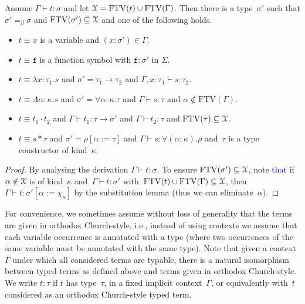 \documentclass[a4paper,UKenglish,cleveref,autoref,numberwithinsect]{lipics-v2019}
\theoremstyle{definition}
\newcommand{\arrtype}{\rightarrow}
\newcommand{\quant}[2]{\forall #1.#2}
\newcommand{\app}[2]{#1 \cdot #2}
\newcommand{\tapp}[2]{#1 * #2}
\newcommand{\subst}[2]{#1:=#2}
\newcommand{\abs}[2]{\lambda #1.#2}
\newcommand{\tabs}[2]{\Lambda #1.#2}
\newcommand{\FTV}{\mathrm{FTV}}
\newcommand{\Xc}{\CKchange{\mathcal{X}}}
\newcommand{\proves}{\vdash}
\newcommand{\CKchange}[1]{\textcolor{blue}{#1}}
\begin{document}
\begin{lemma}\label{lem:generation}
  Assume $\Gamma \proves t : \sigma$ and let $\Xc = \FTV(t) \cup
  \FTV(\Gamma)$. Then there is a type~$\sigma'$ such that $\sigma'
  =_\beta \sigma$ and $\FTV(\sigma') \subseteq \Xc$ and one of the
  following holds.
  \begin{itemize}
  \item $t \equiv x$ is a variable and $(x : \sigma') \in \Gamma$.
  \item $t \equiv \mathtt{f}$ is a function symbol with $\mathtt{f} :
    \sigma'$ in $\Sigma$.
  \item $t \equiv \abs{x:\tau_1}{s}$ and
    $\sigma'=\tau_1\arrtype\tau_2$ and $\Gamma, x : \tau_1 \vdash s :
    \tau_2$.
  \item $t \equiv \tabs{\alpha:\kappa}{s}$ and $\sigma' =
    \quant{\alpha:\kappa}{\tau}$ and $\Gamma \vdash s : \tau$ and $\alpha
    \notin \FTV(\Gamma)$.
  \item $t \equiv \app{t_1}{t_2}$ and
    $\Gamma \vdash t_1 : \tau \arrtype \sigma'$ and
    $\Gamma \vdash t_2 : \tau$ and $\FTV(\tau) \subseteq \Xc$.
  \item $t \equiv \tapp{s}{\tau}$ and
    $\sigma' = \rho[\subst{\alpha}{\tau}]$ and
    $\Gamma \vdash s : \quant{(\alpha:\kappa)}{\rho}$ and~$\tau$ is a
    type constructor of kind~$\kappa$.
  \end{itemize}
\end{lemma}

\begin{proof}
  By analysing the derivation $\Gamma \proves t : \sigma$. To
  ensure $\FTV(\sigma') \subseteq \Xc$, note \CKchange{that} if
  $\alpha \notin \Xc$
  is of kind~$\kappa$ and~$\Gamma \proves t : \sigma'$
  with~$\FTV(t) \cup \FTV(\Gamma) \subseteq \Xc$, then $\Gamma
  \proves t : \sigma'[\subst{\alpha}{\chi_\kappa}]$ by the
  substitution lemma (thus we can eliminate~$\alpha$).
\end{proof}

For convenience, we sometimes assume without loss of generality that
the terms are given in orthodox Church-style, i.e., instead of using
contexts we assume that each variable occurrence is annotated with a
type (where two occurrences of the same variable must be annotated
with the same type). Note that given a context~$\Gamma$ under which
all considered terms are typable, there is a natural isomorphism
between typed terms as defined above and terms given in orthodox
Church-style. We write $t : \tau$ if $t$ has type~$\tau$, in a fixed
implicit context~$\Gamma$, or equivalently with~$t$ considered as an
orthodox Church-style typed term.
\end{document}
